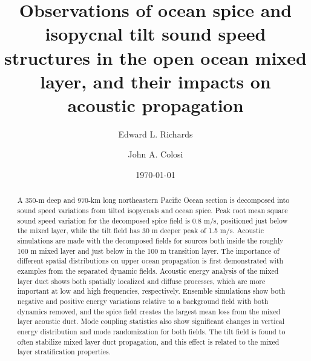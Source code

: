 \documentclass[preprint,NumberedRefs]{JASA}
\begin{document}
\title[Mixed layer tilt and spice]{Observations of ocean spice and isopycnal tilt sound speed structures in the open ocean mixed layer, and their impacts on acoustic propagation}
\author{Edward L. Richards}
\author{John A. Colosi}

\date{\today}

\begin{abstract}
    A 350-m deep and 970-km long northeastern Pacific Ocean section is decomposed into sound speed variations from tilted isopycnals and ocean spice. Peak root mean square sound speed variation for the decomposed spice field is 0.8 m/s, positioned just below the mixed layer, while the tilt field has 30 m deeper peak of 1.5 m/s. Acoustic simulations are made with the decomposed fields for sources both inside the roughly 100 m mixed layer and just below in the 100 m transition layer. The importance of different spatial distributions on upper ocean propagation is first demonstrated with examples from the separated dynamic fields. Acoustic energy analysis of the mixed layer duct shows both spatially localized and diffuse processes, which are more important at low and high frequencies, respectively. Ensemble simulations show both negative and positive energy variations relative to a background field with both dynamics removed, and the spice field creates the largest mean loss from the mixed layer acoustic duct. Mode coupling statistics also show significant changes in vertical energy distribution and mode randomization for both fields. The tilt field is found to often stabilize mixed layer duct propagation, and this effect is related to the mixed layer stratification properties.
\end{abstract}

\maketitle
\end{document}
